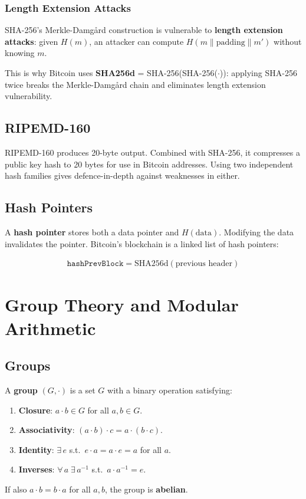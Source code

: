 \documentclass[12pt,a4paper,openany]{book}
\theoremstyle{definition}
\theoremstyle{plain}
\theoremstyle{remark}
\begin{document}
\subsection{Length Extension Attacks}

SHA-256's Merkle-Damg\aa rd construction is vulnerable to \textbf{length
extension attacks}: given $H(m)$, an attacker can compute
$H(m\|\text{padding}\|m')$ without knowing $m$.

This is why Bitcoin uses \textbf{SHA256d} = SHA-256(SHA-256($\cdot$)):
applying SHA-256 twice breaks the Merkle-Damg\aa rd chain and eliminates
length extension vulnerability.

\section{RIPEMD-160}

RIPEMD-160 produces 20-byte output.  Combined with SHA-256, it
compresses a public key hash to 20 bytes for use in Bitcoin addresses.
Using two independent hash families gives defence-in-depth against
weaknesses in either.

\section{Hash Pointers}

A \textbf{hash pointer} stores both a data pointer and $H(\text{data})$.
Modifying the data invalidates the pointer.  Bitcoin's blockchain is a
linked list of hash pointers:

\begin{align}
  \boxed{\texttt{hashPrevBlock} = \mathrm{SHA256d}(\text{previous header})}
\end{align}


\chapter{Group Theory and Modular Arithmetic}
\label{chap:groups}

\section{Groups}

\begin{definitionbox}
  A \textbf{group} $(G,\cdot)$ is a set $G$ with a binary operation
  satisfying:
  \begin{enumerate}[label=(\roman*)]
    \item \textbf{Closure}: $a\cdot b\in G$ for all $a,b\in G$.
    \item \textbf{Associativity}: $(a\cdot b)\cdot c = a\cdot(b\cdot c)$.
    \item \textbf{Identity}: $\exists\,e$ s.t.\ $e\cdot a=a\cdot e=a$ for all $a$.
    \item \textbf{Inverses}: $\forall\,a\;\exists\,a^{-1}$ s.t.\
          $a\cdot a^{-1}=e$.
  \end{enumerate}
  If also $a\cdot b=b\cdot a$ for all $a,b$, the group is \textbf{abelian}.
\end{definitionbox}
\end{document}

